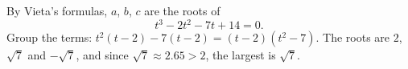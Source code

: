 By Vieta's formulas, $a$, $b$, $c$ are the roots of
\[
t^3-2t^2-7t+14=0 .
\]
Group the terms: $t^2(t-2)-7(t-2)=(t-2)(t^2-7)$. The roots are $2$, $\sqrt7$ and $-\sqrt7$, and since $\sqrt7\approx2.65>2$, the largest is $\boxed{\sqrt7}$.
